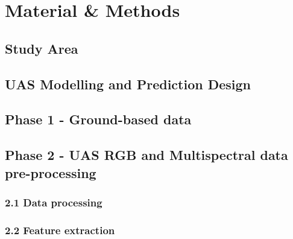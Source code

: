 \section{Material \& Methods}\label{sec:methods}
\subsection{Study Area}\label{sec:area}


\subsection{UAS Modelling and Prediction Design}\label{sec:modelling}



\subsection{Phase 1 - Ground-based data}\label{sec:ground}


\subsection{Phase 2 - UAS RGB and Multispectral data pre-processing}\label{sec:rgb}
\subsubsection{2.1 Data processing}

\subsubsection{2.2 Feature extraction}

